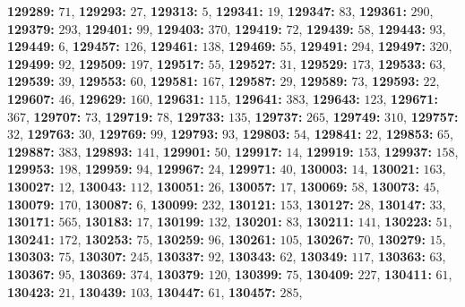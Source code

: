 \textsf{\bfseries 129289:} $71$, \textsf{\bfseries 129293:} $27$, \textsf{\bfseries 129313:} $5$, \textsf{\bfseries 129341:} $19$, \textsf{\bfseries 129347:} $83$, \textsf{\bfseries 129361:} $290$, \textsf{\bfseries 129379:} $293$, \textsf{\bfseries 129401:} $99$, \textsf{\bfseries 129403:} $370$, \textsf{\bfseries 129419:} $72$, \textsf{\bfseries 129439:} $58$, \textsf{\bfseries 129443:} $93$, \textsf{\bfseries 129449:} $6$, \textsf{\bfseries 129457:} $126$, \textsf{\bfseries 129461:} $138$, \textsf{\bfseries 129469:} $55$, \textsf{\bfseries 129491:} $294$, \textsf{\bfseries 129497:} $320$, \textsf{\bfseries 129499:} $92$, \textsf{\bfseries 129509:} $197$, \textsf{\bfseries 129517:} $55$, \textsf{\bfseries 129527:} $31$, \textsf{\bfseries 129529:} $173$, \textsf{\bfseries 129533:} $63$, \textsf{\bfseries 129539:} $39$, \textsf{\bfseries 129553:} $60$, \textsf{\bfseries 129581:} $167$, \textsf{\bfseries 129587:} $29$, \textsf{\bfseries 129589:} $73$, \textsf{\bfseries 129593:} $22$, \textsf{\bfseries 129607:} $46$, \textsf{\bfseries 129629:} $160$, \textsf{\bfseries 129631:} $115$, \textsf{\bfseries 129641:} $383$, \textsf{\bfseries 129643:} $123$, \textsf{\bfseries 129671:} $367$, \textsf{\bfseries 129707:} $73$, \textsf{\bfseries 129719:} $78$, \textsf{\bfseries 129733:} $135$, \textsf{\bfseries 129737:} $265$, \textsf{\bfseries 129749:} $310$, \textsf{\bfseries 129757:} $32$, \textsf{\bfseries 129763:} $30$, \textsf{\bfseries 129769:} $99$, \textsf{\bfseries 129793:} $93$, \textsf{\bfseries 129803:} $54$, \textsf{\bfseries 129841:} $22$, \textsf{\bfseries 129853:} $65$, \textsf{\bfseries 129887:} $383$, \textsf{\bfseries 129893:} $141$, \textsf{\bfseries 129901:} $50$, \textsf{\bfseries 129917:} $14$, \textsf{\bfseries 129919:} $153$, \textsf{\bfseries 129937:} $158$, \textsf{\bfseries 129953:} $198$, \textsf{\bfseries 129959:} $94$, \textsf{\bfseries 129967:} $24$, \textsf{\bfseries 129971:} $40$, \textsf{\bfseries 130003:} $14$, \textsf{\bfseries 130021:} $163$, \textsf{\bfseries 130027:} $12$, \textsf{\bfseries 130043:} $112$, \textsf{\bfseries 130051:} $26$, \textsf{\bfseries 130057:} $17$, \textsf{\bfseries 130069:} $58$, \textsf{\bfseries 130073:} $45$, \textsf{\bfseries 130079:} $170$, \textsf{\bfseries 130087:} $6$, \textsf{\bfseries 130099:} $232$, \textsf{\bfseries 130121:} $153$, \textsf{\bfseries 130127:} $28$, \textsf{\bfseries 130147:} $33$, \textsf{\bfseries 130171:} $565$, \textsf{\bfseries 130183:} $17$, \textsf{\bfseries 130199:} $132$, \textsf{\bfseries 130201:} $83$, \textsf{\bfseries 130211:} $141$, \textsf{\bfseries 130223:} $51$, \textsf{\bfseries 130241:} $172$, \textsf{\bfseries 130253:} $75$, \textsf{\bfseries 130259:} $96$, \textsf{\bfseries 130261:} $105$, \textsf{\bfseries 130267:} $70$, \textsf{\bfseries 130279:} $15$, \textsf{\bfseries 130303:} $75$, \textsf{\bfseries 130307:} $245$, \textsf{\bfseries 130337:} $92$, \textsf{\bfseries 130343:} $62$, \textsf{\bfseries 130349:} $117$, \textsf{\bfseries 130363:} $63$, \textsf{\bfseries 130367:} $95$, \textsf{\bfseries 130369:} $374$, \textsf{\bfseries 130379:} $120$, \textsf{\bfseries 130399:} $75$, \textsf{\bfseries 130409:} $227$, \textsf{\bfseries 130411:} $61$, \textsf{\bfseries 130423:} $21$, \textsf{\bfseries 130439:} $103$, \textsf{\bfseries 130447:} $61$, \textsf{\bfseries 130457:} $285$, 
